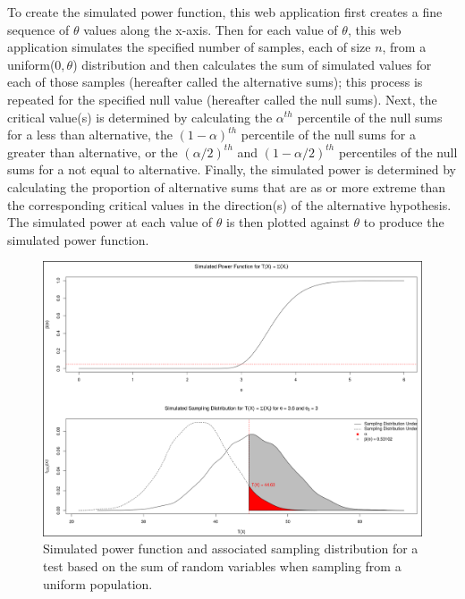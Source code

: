 \documentclass{TISE}
\begin{document}
To create the simulated power function, this web application first  creates a fine sequence of $\theta$ values along the x-axis. Then for each value of $\theta$, this web application simulates the specified number of samples, each of size $n$, from a uniform($0, \theta$) distribution and then calculates the sum of simulated values for each of those samples (hereafter called the alternative sums); this process is repeated for the specified null value (hereafter called the null sums). Next, the critical value(s) is determined by calculating the $\alpha^{th}$ percentile of the null sums for a less than alternative, the $(1 - \alpha)^{th}$ percentile of the null sums for a greater than alternative, or the $(\alpha/2)^{th}$ and $(1 - \alpha/2)^{th}$ percentiles of the null sums for a not equal to alternative. Finally, the simulated power is determined by calculating the proportion of alternative sums that are as or more extreme than the corresponding critical values in the direction(s) of the alternative hypothesis. The simulated power at each value of $\theta$ is then plotted against $\theta$ to produce the simulated power function. 

\begin{figure}[H]
	\centering
	\includegraphics[width=\textwidth]{fig13.png}
	\caption{Simulated power function and associated sampling distribution for a test based on the sum of random variables when sampling from a uniform population.}
\end{figure}
 
\end{document}
